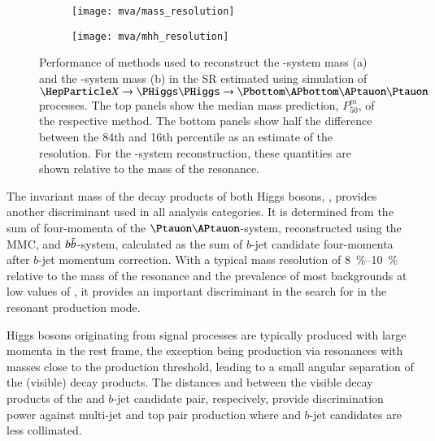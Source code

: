 \begin{figure}[htbp]
  \centering

  \begin{subfigure}[t]{.5\textwidth}
    \centering
    \texttt{[image: mva/mass\_resolution]}
    \label{fig:mass_reconstruction_H}
  \end{subfigure}\hfill%
  \begin{subfigure}[t]{.5\textwidth}
    \centering
    \texttt{[image: mva/mhh\_resolution]}
    \label{fig:mass_reconstruction_HH}
  \end{subfigure}

  \caption{Performance of methods used to reconstruct the
    \PHiggs-system mass (a) and the \HH-system mass (b) in the \hadhad
    SR estimated using simulation of $\PX \ra \HH \ra \bbtautau$
    processes. The top panels show the median mass prediction,
    $P_{50}^{m}$, of the respective method. The bottom panels show
    half the difference between the 84th and 16th percentile as an
    estimate of the resolution. For the \HH-system reconstruction,
    these quantities are shown relative to the mass of the resonance.}
  \label{fig:mass_reconstruction}
\end{figure}

The invariant mass of the decay products of both Higgs bosons, \mHH,
provides another discriminant used in all analysis categories. It is
determined from the sum of four-momenta of the
$\Ptauon\APtauon$-system, reconstructed using the MMC, and
$b\bar{b}$-system, calculated as the sum of $b$-jet candidate
four-momenta after $b$-jet momentum correction. With a typical mass
resolution of \SIrange{8}{10}{\percent} relative to the mass of the
resonance and the prevalence of most backgrounds at low values of
\mHH, it provides an important discriminant in the search for \HH in
the resonant production mode.

Higgs bosons originating from signal processes are typically produced
with large momenta in the \HH rest frame, the exception being \HH
production via resonances with masses close to the \HH production
threshold, leading to a small angular separation of the (visible)
\PHiggs decay products. The distances \dRtautau and \dRbb between the
visible decay products of the \taulepton and $b$-jet candidate pair,
respecively, provide discrimination power against multi-jet and top
pair production where \taulepton and $b$-jet candidates are less
collimated.

